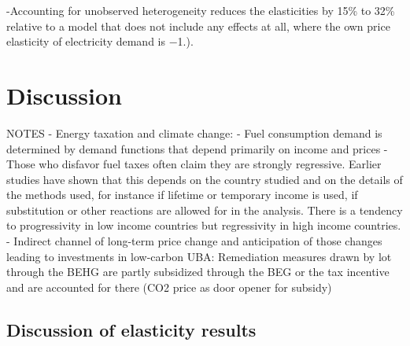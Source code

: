 \documentclass[12pt,twoside]{reedthesis}
\begin{document}
-Accounting for unobserved heterogeneity reduces the elasticities by 15\% to 32\% relative to a model that does not include any effects at all, where the own price elasticity of electricity demand is −1.).

\hypertarget{discussion}{%
\chapter{Discussion}\label{discussion}}

NOTES - Energy taxation and climate change:
- Fuel consumption demand is determined by demand functions that depend primarily on income and prices
- Those who disfavor fuel taxes often claim they are strongly regressive. Earlier studies have shown that this depends on the country studied and on the details of the methods used, for instance if lifetime or temporary income is used, if substitution or other reactions are allowed for in the analysis. There is a tendency to progressivity in low income countries but regressivity in high income countries.
- Indirect channel of long-term price change and anticipation of those changes leading to investments in low-carbon UBA: Remediation measures drawn by lot through the BEHG are partly subsidized through the BEG or the tax incentive and are accounted for there (CO2 price as door opener for subsidy)

\hypertarget{discussion-of-elasticity-results}{%
\section{Discussion of elasticity results}\label{discussion-of-elasticity-results}}
\end{document}
